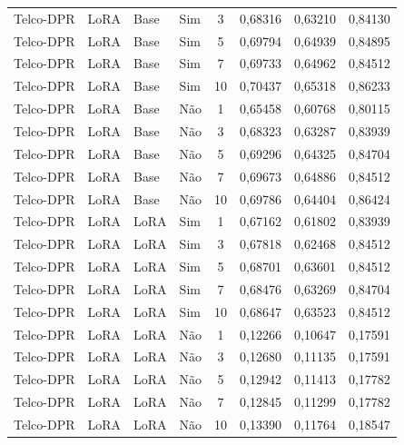 \begin{longtable}{llllcccc}
Telco-DPR & LoRA & Base & Sim & 3 & 0,68316 & 0,63210 & 0,84130 \\
Telco-DPR & LoRA & Base & Sim & 5 & 0,69794 & 0,64939 & 0,84895 \\
Telco-DPR & LoRA & Base & Sim & 7 & 0,69733 & 0,64962 & 0,84512 \\
Telco-DPR & LoRA & Base & Sim & 10 & 0,70437 & 0,65318 & 0,86233 \\
Telco-DPR & LoRA & Base & Não & 1 & 0,65458 & 0,60768 & 0,80115 \\
Telco-DPR & LoRA & Base & Não & 3 & 0,68323 & 0,63287 & 0,83939 \\
Telco-DPR & LoRA & Base & Não & 5 & 0,69296 & 0,64325 & 0,84704 \\
Telco-DPR & LoRA & Base & Não & 7 & 0,69673 & 0,64886 & 0,84512 \\
Telco-DPR & LoRA & Base & Não & 10 & 0,69786 & 0,64404 & 0,86424 \\
Telco-DPR & LoRA & LoRA & Sim & 1 & 0,67162 & 0,61802 & 0,83939 \\
Telco-DPR & LoRA & LoRA & Sim & 3 & 0,67818 & 0,62468 & 0,84512 \\
Telco-DPR & LoRA & LoRA & Sim & 5 & 0,68701 & 0,63601 & 0,84512 \\
Telco-DPR & LoRA & LoRA & Sim & 7 & 0,68476 & 0,63269 & 0,84704 \\
Telco-DPR & LoRA & LoRA & Sim & 10 & 0,68647 & 0,63523 & 0,84512 \\
Telco-DPR & LoRA & LoRA & Não & 1 & 0,12266 & 0,10647 & 0,17591 \\
Telco-DPR & LoRA & LoRA & Não & 3 & 0,12680 & 0,11135 & 0,17591 \\
Telco-DPR & LoRA & LoRA & Não & 5 & 0,12942 & 0,11413 & 0,17782 \\
Telco-DPR & LoRA & LoRA & Não & 7 & 0,12845 & 0,11299 & 0,17782 \\
Telco-DPR & LoRA & LoRA & Não & 10 & 0,13390 & 0,11764 & 0,18547 \\
\end{longtable}
